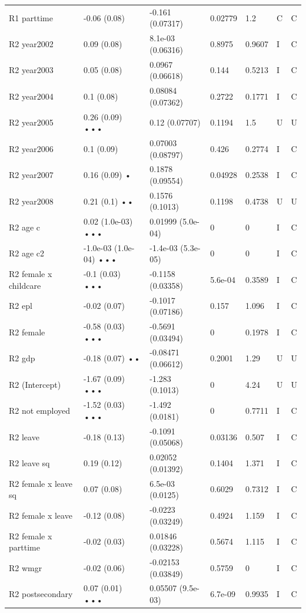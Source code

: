 {\begin{longtable}{@{}p{.245\linewidth}p{.17\linewidth}p{.17\linewidth}p{.085\linewidth}p{.060\linewidth}p{.08\linewidth}p{.07\linewidth}@{}}
R1 parttime & -0.06 (0.08) & -0.161 (0.07317) & 0.02779 & 1.2 & C & C\\
R2 year2002 & 0.09 (0.08) & 8.1e-03 (0.06316) & 0.8975 & 0.9607 & I & C\\
R2 year2003 & 0.05 (0.08) & 0.0967 (0.06618) & 0.144 & 0.5213 & I & C\\
R2 year2004 & 0.1 (0.08) & 0.08084 (0.07362) & 0.2722 & 0.1771 & I & C\\
R2 year2005 & 0.26 (0.09) ••• & 0.12 (0.07707) & 0.1194 & 1.5 & U & U\\
R2 year2006 & 0.1 (0.09) & 0.07003 (0.08797) & 0.426 & 0.2774 & I & C\\
R2 year2007 & 0.16 (0.09) • & 0.1878 (0.09554) & 0.04928 & 0.2538 & I & C\\
R2 year2008 & 0.21 (0.1) •• & 0.1576 (0.1013) & 0.1198 & 0.4738 & U & U\\
R2 age c & 0.02 (1.0e-03) ••• & 0.01999 (5.0e-04) & 0 & 0 & I & C\\
R2 age c2 & -1.0e-03 (1.0e-04) ••• & -1.4e-03 (5.3e-05) & 0 & 0 & I & C\\
R2 female x childcare & -0.1 (0.03) ••• & -0.1158 (0.03358) & 5.6e-04 & 0.3589 & I & C\\
R2 epl & -0.02 (0.07) & -0.1017 (0.07186) & 0.157 & 1.096 & I & C\\
R2 female & -0.58 (0.03) ••• & -0.5691 (0.03494) & 0 & 0.1978 & I & C\\
R2 gdp & -0.18 (0.07) •• & -0.08471 (0.06612) & 0.2001 & 1.29 & U & U\\
R2 (Intercept) & -1.67 (0.09) ••• & -1.283 (0.1013) & 0 & 4.24 & U & U\\
R2 not employed & -1.52 (0.03) ••• & -1.492 (0.0181) & 0 & 0.7711 & I & C\\
R2 leave & -0.18 (0.13) & -0.1091 (0.05068) & 0.03136 & 0.507 & I & C\\
R2 leave sq & 0.19 (0.12) & 0.02052 (0.01392) & 0.1404 & 1.371 & I & C\\
R2 female x leave sq & 0.07 (0.08) & 6.5e-03 (0.0125) & 0.6029 & 0.7312 & I & C\\
R2 female x leave & -0.12 (0.08) & -0.0223 (0.03249) & 0.4924 & 1.159 & I & C\\
R2 female x parttime & -0.02 (0.03) & 0.01846 (0.03228) & 0.5674 & 1.115 & I & C\\
R2 wmgr & -0.02 (0.06) & -0.02153 (0.03849) & 0.5759 & 0 & I & C\\
R2 postsecondary & 0.07 (0.01) ••• & 0.05507 (9.5e-03) & 6.7e-09 & 0.9935 & I & C\\

\end{longtable}}
